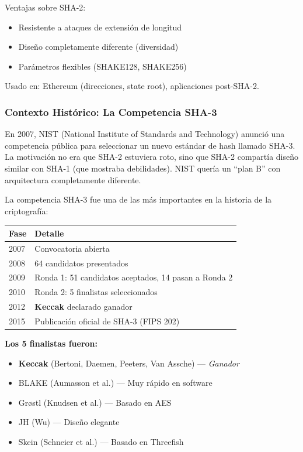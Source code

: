 \documentclass[11pt,a4paper,twoside,openright]{book}
\theoremstyle{definition}
\theoremstyle{plain}
\theoremstyle{remark}
\begin{document}
Ventajas sobre SHA-2:
\begin{itemize}
    \item Resistente a ataques de extensión de longitud
    \item Diseño completamente diferente (diversidad)
    \item Parámetros flexibles (SHAKE128, SHAKE256)
\end{itemize}

Usado en: Ethereum (direcciones, state root), aplicaciones post-SHA-2.

\subsubsection{Contexto Histórico: La Competencia SHA-3}

\begin{intuicion}
En 2007, NIST (National Institute of Standards and Technology) anunció una competencia pública para seleccionar un nuevo estándar de hash llamado SHA-3. La motivación no era que SHA-2 estuviera roto, sino que SHA-2 compartía diseño similar con SHA-1 (que mostraba debilidades). NIST quería un ``plan B'' con arquitectura completamente diferente.
\end{intuicion}

La competencia SHA-3 fue una de las más importantes en la historia de la criptografía:

\begin{center}
\begin{tabular}{ll}
\toprule
\textbf{Fase} & \textbf{Detalle} \\
\midrule
2007 & Convocatoria abierta \\
2008 & 64 candidatos presentados \\
2009 & Ronda 1: 51 candidatos aceptados, 14 pasan a Ronda 2 \\
2010 & Ronda 2: 5 finalistas seleccionados \\
2012 & \textbf{Keccak} declarado ganador \\
2015 & Publicación oficial de SHA-3 (FIPS 202) \\
\bottomrule
\end{tabular}
\end{center}

\textbf{Los 5 finalistas fueron:}
\begin{itemize}
    \item \textbf{Keccak} (Bertoni, Daemen, Peeters, Van Assche) --- \textit{Ganador}
    \item BLAKE (Aumasson et al.) --- Muy rápido en software
    \item Grøstl (Knudsen et al.) --- Basado en AES
    \item JH (Wu) --- Diseño elegante
    \item Skein (Schneier et al.) --- Basado en Threefish
\end{itemize}
\end{document}
